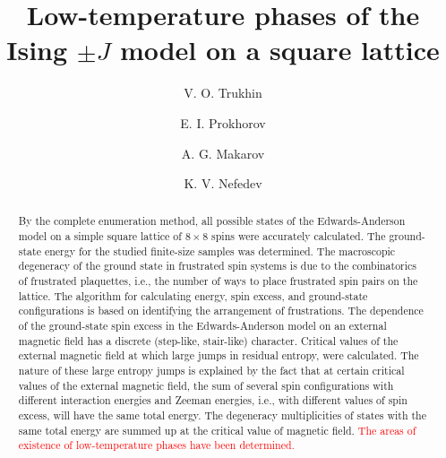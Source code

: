 \documentclass[preprint,12pt]{elsarticle}
\begin{document}
	
	\begin{frontmatter}
		
		
		\title{Low-temperature phases of the Ising $\pm J$ model on a square lattice}
		
		\author[FEFU,IPM]{V. O. Trukhin}
		\author[FEFU]{E. I. Prokhorov}
		\author[FEFU,IPM]{A. G. Makarov}
		\author[FEFU,IPM]{K. V. Nefedev}
		
		\begin{abstract}
			
			By the complete enumeration method, all possible states of the Edwards-Anderson model on a simple square lattice of $8 \times 8$ spins were accurately calculated. The ground-state energy for the studied finite-size samples was determined. The macroscopic degeneracy of the ground state in frustrated spin systems is due to the combinatorics of frustrated plaquettes, i.e., the number of ways to place frustrated spin pairs on the lattice. The algorithm for calculating energy, spin excess, and ground-state configurations is based on identifying the arrangement of frustrations. The dependence of the ground-state spin excess in the Edwards-Anderson model on an external magnetic field has a discrete (step-like, stair-like) character. Critical values of the external magnetic field at which large jumps in residual entropy, were calculated. The nature of these large entropy jumps is explained by the fact that at certain critical values of the external magnetic field, the sum of several spin configurations with different interaction energies and Zeeman energies, i.e., with different values of spin excess, will have the same total energy. The degeneracy multiplicities of states with the same total energy are summed up at the critical value of magnetic field. \textcolor{red}{The areas of existence of low-temperature phases have been determined.}
			

\end{abstract}
\end{frontmatter}
\end{document}
